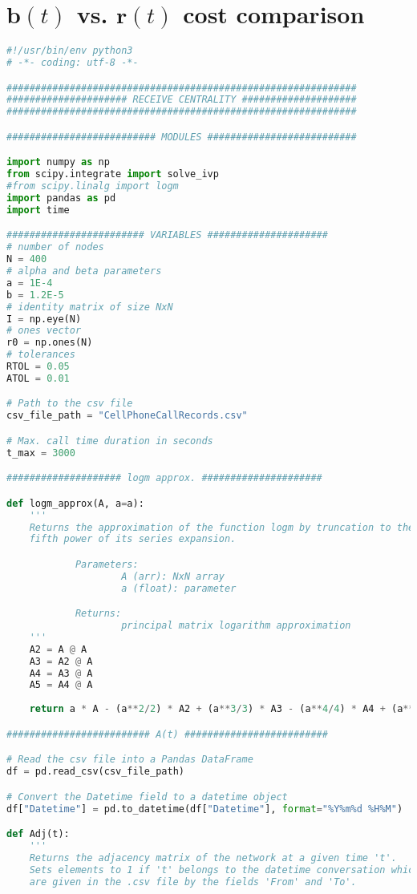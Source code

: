 \section*{$\mathbf{b}(t)$ vs. $\mathbf{r}(t)$ cost comparison}
\label{sec:brc}
\begin{lstlisting}[language=Python, caption=$\mathbf{b}(t)$ vs. $\mathbf{r}(t)$ cost comparison]
#!/usr/bin/env python3
# -*- coding: utf-8 -*-

#############################################################
##################### RECEIVE CENTRALITY ####################
#############################################################

########################## MODULES ##########################

import numpy as np
from scipy.integrate import solve_ivp
#from scipy.linalg import logm
import pandas as pd
import time

######################## VARIABLES #####################
# number of nodes
N = 400 
# alpha and beta parameters
a = 1E-4
b = 1.2E-5
# identity matrix of size NxN
I = np.eye(N)
# ones vector
r0 = np.ones(N)
# tolerances
RTOL = 0.05
ATOL = 0.01

# Path to the csv file
csv_file_path = "CellPhoneCallRecords.csv"

# Max. call time duration in seconds
t_max = 3000

#################### logm approx. #####################

def logm_approx(A, a=a):
    '''
    Returns the approximation of the function logm by truncation to the 
    fifth power of its series expansion.

            Parameters:
                    A (arr): NxN array 
                    a (float): parameter

            Returns:
                    principal matrix logarithm approximation 
    '''
    A2 = A @ A
    A3 = A2 @ A
    A4 = A3 @ A
    A5 = A4 @ A
    
    return a * A - (a**2/2) * A2 + (a**3/3) * A3 - (a**4/4) * A4 + (a**5/5) * A5

######################### A(t) #########################

# Read the csv file into a Pandas DataFrame
df = pd.read_csv(csv_file_path)

# Convert the Datetime field to a datetime object
df["Datetime"] = pd.to_datetime(df["Datetime"], format="%Y%m%d %H%M")

def Adj(t):
    '''
    Returns the adjacency matrix of the network at a given time 't'. 
    Sets elements to 1 if 't' belongs to the datetime conversation which nodes
    are given in the .csv file by the fields 'From' and 'To'.


\end{lstlisting}
